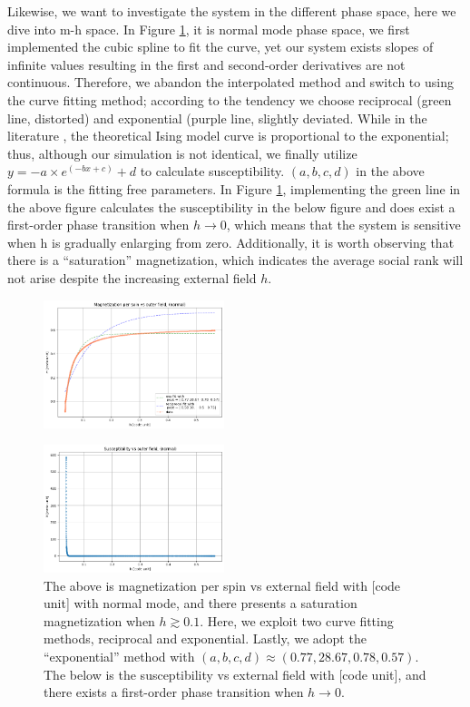 \documentclass[10pt]{article}
\begin{document}
\begin{multicols}{2}
        Likewise, we want to investigate the system in the different phase space, here we dive into m-h space. In Figure \ref{norm_phase}, it is normal mode phase space, we first implemented the cubic spline to fit the curve, yet our system exists slopes of infinite values resulting in the first and second-order derivatives are not continuous. Therefore, we abandon the interpolated method and switch to using the curve fitting method; according to the tendency we choose reciprocal (green line, distorted) and exponential (purple line, slightly deviated. While in the literature \cite{fit}, the theoretical Ising model curve is proportional to the exponential; thus, although our simulation is not identical, we finally utilize $y = -a \times e^{(-bx + c)} + d$ to calculate susceptibility. $(a,b,c,d)$ in the above formula is the fitting free parameters. In Figure \ref{norm_phase}, implementing the green line in the above figure calculates the susceptibility in the below figure and does exist a first-order phase transition when $h \rightarrow 0$, which means that the system is sensitive when h is gradually enlarging from zero. Additionally, it is worth observing that there is a ``saturation'' magnetization, which indicates the average social rank will not arise despite the increasing external field $h$.
    \begin{figure}[H]
        \centering
        \includegraphics[width = 0.47\textwidth]{normal_mh.png} 
    \end{figure}
    \begin{figure}[H]
        \centering  
        \includegraphics[width = 0.47\textwidth]{normal_Xh.png}
        \caption{The above is magnetization per spin vs external field with [code unit] with normal mode, and there presents a saturation magnetization when $h \gtrsim 0.1$. Here, we exploit two curve fitting methods, reciprocal and exponential. Lastly, we adopt the ``exponential'' method with $(a,b,c,d) \approx (0.77, 28.67, 0.78, 0.57)$. The below is the susceptibility vs external field with [code unit], and there exists a first-order phase transition when $h \rightarrow 0$.}
        \label{norm_phase}
    \end{figure}


\end{multicols}
\end{document}
